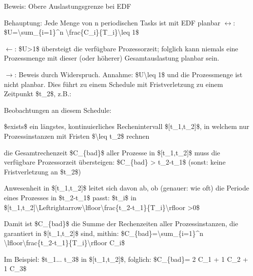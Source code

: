\documentclass[a4paper]{article}
\begin{document}
\begin{multicols}{3}
\begin{itemize*}
\begin{itemize*}
        \end{itemize*}
        \item Beweis: Obere Auslastungsgrenze bei EDF
        \begin{itemize*}
            \item Behauptung: Jede Menge von n periodischen Tasks ist mit EDF planbar $\leftrightarrow$: \$U=\textbackslash sum\_\{i=1\}\^{}n \textbackslash frac\{C\_i\}\{T\_i\}\textbackslash leq 1\$
            \item $\leftarrow$: \$U\textgreater1\$ übersteigt die verfügbare Prozessorzeit; folglich kann niemals eine Prozessmenge mit dieser (oder höherer) Gesamtauslastung planbar sein.
            \item $\rightarrow$: Beweis durch Widerspruch. Annahme: \$U\textbackslash leq 1\$ und die Prozessmenge ist nicht planbar. Dies führt zu einem Schedule mit Fristverletzung zu einem Zeitpunkt \$t\_2\$, z.B.:
            \item Beobachtungen an diesem Schedule:
            \begin{itemize*}
                \item \$exists\$ ein längstes, kontinuierliches Rechenintervall \${[}t\_1,t\_2{]}\$, in welchem nur Prozessinstanzen mit Fristen \$\textbackslash leq t\_2\$ rechnen
                \item die Gesamtrechenzeit \$C\_\{bad\}\$ aller Prozesse in \${[}t\_1,t\_2{]}\$ muss die verfügbare Prozessorzeit übersteigen: \$C\_\{bad\} \textgreater{} t\_2-t\_1\$ (sonst: keine Fristverletzung an \$t\_2\$)
                \item Anwesenheit in \${[}t\_1,t\_2{]}\$ leitet sich davon ab, ob (genauer: wie oft) die Periode eines Prozesses in \$t\_2-t\_1\$ passt: \$t\_i\$ in \${[}t\_1,t\_2{]}\textbackslash Leftrightarrow\textbackslash lfloor\textbackslash frac\{t\_2-t\_1\}\{T\_i\}\textbackslash rfloor \textgreater0\$
                \item Damit ist \$C\_\{bad\}\$ die Summe der Rechenzeiten aller Prozessinstanzen, die garantiert in \${[}t\_1,t\_2{]}\$ sind, mithin: \$C\_\{bad\}=\textbackslash sum\_\{i=1\}\^{}n \textbackslash lfloor\textbackslash frac\{t\_2-t\_1\}\{T\_i\}\textbackslash rfloor C\_i\$
                \item Im Beispiel: \$t\_1... t\_3\$ in \${[}t\_1,t\_2{]}\$, folglich: \$C\_\{bad\}= 2 C\_1 + 1 C\_2 + 1 C\_3\$

\end{itemize*}
\end{itemize*}
\end{itemize*}
\end{multicols}
\end{document}
